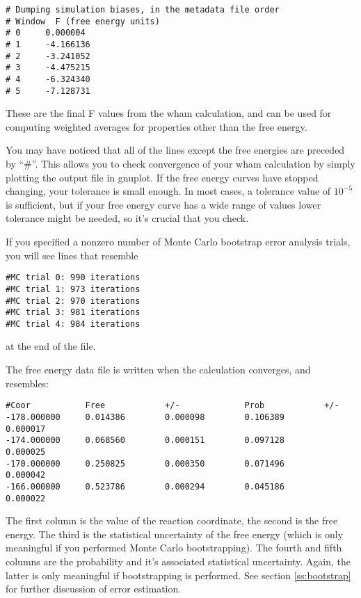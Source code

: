 \documentclass[12pt]{article}
\begin{document}
\begin{verbatim}
# Dumping simulation biases, in the metadata file order
# Window  F (free energy units)
# 0     0.000004
# 1     -4.166136
# 2     -3.241052
# 3     -4.475215
# 4     -6.324340
# 5     -7.128731
\end{verbatim}

These are the final F values from the wham calculation, and can be used for
computing weighted averages for properties other than the free energy.

You may have noticed that all of the lines except the free energies are preceded
by ``\#''.  This allows you to check convergence of your wham calculation by
simply plotting the output file in gnuplot.  If the free energy curves have
stopped changing, your tolerance is small enough. In most cases, a tolerance
value of $10^{-5}$ is sufficient, but if your free energy curve has a wide range
of values lower tolerance might be needed, so it's crucial that you check.

If you specified a nonzero number of Monte Carlo bootstrap error analysis
trials, you will see lines that resemble

\begin{verbatim}
#MC trial 0: 990 iterations
#MC trial 1: 973 iterations
#MC trial 2: 970 iterations
#MC trial 3: 981 iterations
#MC trial 4: 984 iterations
\end{verbatim}

at the end of the file.

The free energy data file is written when the calculation converges, and
resembles:

\begin{verbatim}
#Coor           Free            +/-             Prob            +/-
-178.000000     0.014386        0.000098        0.106389        0.000017
-174.000000     0.068560        0.000151        0.097128        0.000025
-170.000000     0.250825        0.000350        0.071496        0.000042
-166.000000     0.523786        0.000294        0.045186        0.000022
\end{verbatim}

The first column is the value of the reaction coordinate, the second is the
free energy.  The third is the statistical uncertainty of the free energy
(which is only meaningful if you performed Monte Carlo bootstrapping).  The
fourth and fifth columns are the probability and it's associated
statistical uncertainty.  Again, the latter is only meaningful if
bootstrapping is performed.  See section \ref{ss:bootstrap} for further
discussion of error estimation.
\end{document}
